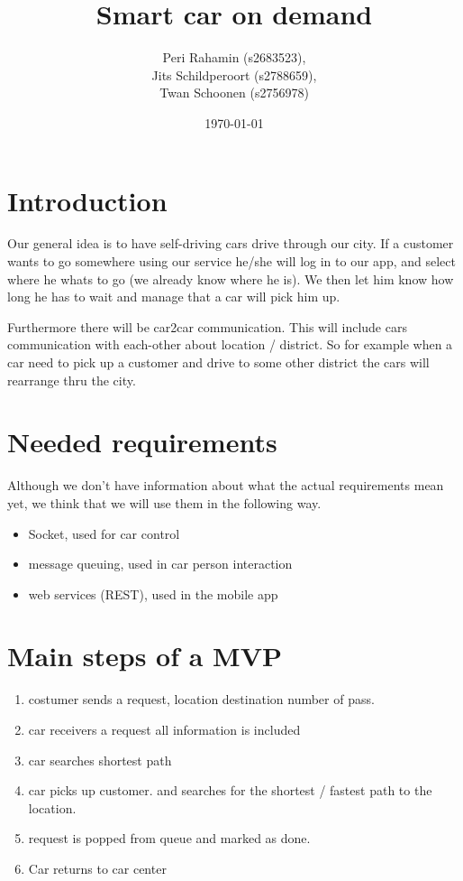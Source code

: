 \documentclass[8pt]{article}
\title{Smart car on demand}
\author{Peri Rahamin (s2683523),\\
  Jits Schildperoort (s2788659),\\
  Twan Schoonen (s2756978)}
\date{\today}
\begin{document}
\maketitle

\section{Introduction}

Our general idea is to have self-driving cars drive through our city.
If a customer wants to go somewhere using our service he/she will log in to our app, and select where he whats to go (we already know where he is).
We then let him know how long he has to wait and manage that a car will pick him up.

Furthermore there will be car2car communication. This will include cars communication with each-other about location / district. So for example when a car need to pick up a customer and drive to some other district the cars will rearrange thru the city.

\section{Needed requirements}
Although we don't have information about what the actual requirements mean yet, we think that we will use them in the following way.
\begin{itemize}
\item Socket, used for car control
\item message queuing, used in car \- person interaction
\item web services (REST), used in the mobile app
\end{itemize}


\section{Main steps of a MVP}

\begin{enumerate}
\item costumer sends a request, location destination number of pass.
  
\item car receivers a request all information is included
  
\item car searches shortest path

\item car picks up customer. and searches for the shortest / fastest path to the location.

\item request is popped from queue and marked as done.

\item Car returns to car center

\end{enumerate}
\end{document}
